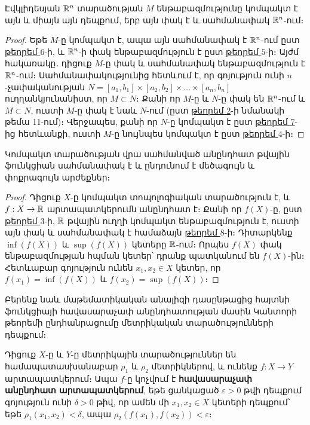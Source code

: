 \documentclass[./main.tex]{subfiles}
\begin{document}
\begin{theorem}\label{ch16thm8}\label{թեորեմ 8}
Էվկլիդեսյան $\mathbb{R}^n$ տարածության $M$ ենթաբազմությունը կոմպակտ է այն և միայն այն դեպքում, երբ այն փակ է և սահմանափակ $\mathbb{R}^n$-ում։
\end{theorem} %
\begin{proof}
Եթե $M$-ը կոմպակտ է, ապա այն սահմանափակ է $\mathbb{R}^n$-ում ըստ \hyperref[թեորեմ 6]{թեորեմ $6$}-ի, և $\mathbb{R}^n$-ի փակ ենթաբազմություն է ըստ \hyperref[թեորեմ 5]{թեորեմ $5$}-ի։ Այժմ հակառակը․ դիցուք $M$-ը փակ և սահմանափակ ենթաբազմություն է $\mathbb{R}^n$-ում։ Սահմանա\-փա\-կու\-թյունից հետևում է, որ գոյություն ունի $n$-չափականության $ N=[ a_1,b_1 ]\times [ a_2,b_2 ] \times \dots \times [ a_n,b_n ]$  ուղ\-ղանկ\-յու\-նա\-նիստ, որ $M\subset N$։ Քանի որ $M$-ը և $N$-ը փակ են $\mathbb{R}^n$-ում և $M\subset N$, ուստի $M$-ը փակ է նաև $N$-ում (ըստ \hyperref[ch11thm2]{թեորեմ 2}-ի նմանակի թեմա 11-ում)։ Վերջապես, քանի որ $N$-ը կոմպակտ է ըստ \hyperref[թեորեմ 7]{թեորեմ 7}-ից հետևանքի, ուստի $M$-ը նույնպես կոմպակտ է ըստ \hyperref[թեորեմ 4]{թեորեմ $4$}-ի։
\end{proof}

\begin{theorem}\label{ch16thm9} \label{թեորեմ 9} 
Կոմպակտ տարածության վրա սահմանված ան\-ընդ\-հատ թվային ֆունկցիան սահմանափակ է և ընդունում է մեծագույն և փոքրագույն արժեքներ։
\end{theorem} %

\begin{proof}
Դիցուք $X$-ը կոմպակտ տոպոլոգիական տարածություն է, և ${f:X\rightarrow \mathbb{R}}$ արտապատկերումն անընդհատ է։ Քանի որ $f(X)$-ը, ըստ \hyperref[թեորեմ 3]{թեորեմ $3$}-ի, $\mathbb{R}$ թվային ուղղի կոմպակտ ենթաբազմություն է, ուստի այն փակ և սահմանափակ է համաձայն \hyperref[թեորեմ 8]{թեորեմ $8$}-ի։ Դիտարկենք $\inf(f(X))$ և $\sup⁡(f(X))$ կետերը $\mathbb{R}$-ում։ Որպես $f(X)$ փակ ենթաբազմության հպման կետեր՝ դրանք պատկանում են $f(X)$-ին։ Հետևաբար գոյություն ունեն $x_1,x_2\in X$ կետեր, որ $f(x_1)=\inf(f(X))$ և $f(x_2)=\sup(f(X))$։ 
\end{proof}

\par Բերենք նաև մաթեմատիկական անալիզի դասընթացից հայտնի ֆունկցիայի հա\-վա\-սարաչափ անընդհատության մասին Կանտորի թեորեմի ընդհանրացումը մետ\-րի\-կա\-կան տարածությունների դեպքում։

\begin{definition}
Դիցուք $X$-ը և $Y$-ը մետրիկային տարածություններ են համա\-պա\-տաս\-խա\-նա\-բար $\rho_1$ և $\rho_2$ մետրիկներով, և ունենք $f: X \to Y$ արտապատկերում։ Ապա $f$-ը կոչվում է \textbf{հավասարաչափ անընդհատ արտապատկերում}, եթե ցանկացած $\varepsilon > 0$ թվի դեպքում գոյություն ունի $\delta > 0$ թիվ, որ ամեն մի $x_1, x_2 \in X$ կետերի դեպքում՝ եթե $\rho_1(x_1, x_2) < \delta$, ապա $\rho_2(f(x_1), f(x_2)) < \varepsilon$։
\end{definition}
\end{document}
